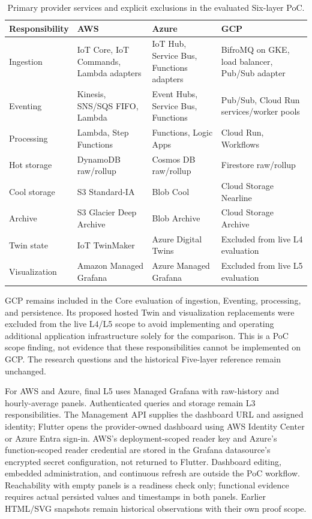 \begin{table}[htbp]
    \centering
    \caption{Primary provider services and explicit exclusions in the evaluated Six-layer PoC.}
    \label{tab:resource-mapping}
    \small
    \begin{tabularx}{\textwidth}{@{} l X X X @{}}
        \toprule
        \textbf{Responsibility} & \textbf{AWS} & \textbf{Azure} & \textbf{GCP} \\
        \midrule
        Ingestion & IoT Core, IoT Commands, Lambda adapters & IoT Hub, Service Bus, Functions adapters & BifroMQ on GKE, load balancer, Pub/Sub adapter \\
        Eventing & Kinesis, SNS/SQS FIFO, Lambda & Event Hubs, Service Bus, Functions & Pub/Sub, Cloud Run services/worker pools \\
        Processing & Lambda, Step Functions & Functions, Logic Apps & Cloud Run, Workflows \\
        Hot storage & DynamoDB raw/rollup & Cosmos DB raw/rollup & Firestore raw/rollup \\
        Cool storage & S3 Standard-IA & Blob Cool & Cloud Storage Nearline \\
        Archive & S3 Glacier Deep Archive & Blob Archive & Cloud Storage Archive \\
        Twin state & IoT TwinMaker & Azure Digital Twins & Excluded from live L4 evaluation \\
        Visualization & Amazon Managed Grafana & Azure Managed Grafana & Excluded from live L5 evaluation \\
        \bottomrule
    \end{tabularx}
\end{table}

GCP remains included in the Core evaluation of ingestion, Eventing, processing,
and persistence. Its proposed hosted Twin and visualization replacements were
excluded from the live L4/L5 scope to avoid implementing and operating additional
application infrastructure solely for the comparison. This is a PoC scope
finding, not evidence that these responsibilities cannot be implemented on GCP.
The research questions and the historical Five-layer reference remain unchanged.

For AWS and Azure, final L5 uses Managed Grafana with raw-history and
hourly-average panels. Authenticated queries and storage remain L3
responsibilities. The Management API supplies the dashboard URL and assigned
identity; Flutter opens the provider-owned dashboard using AWS Identity Center
or Azure Entra sign-in. AWS's deployment-scoped reader key and Azure's
function-scoped reader credential are stored in the Grafana datasource's
encrypted secret configuration, not returned to Flutter. Dashboard editing,
embedded administration, and continuous refresh are outside the PoC workflow.
Reachability with empty panels is a readiness check only; functional evidence
requires actual persisted values and timestamps in both panels. Earlier
HTML/SVG snapshots remain historical observations with their own proof scope.

